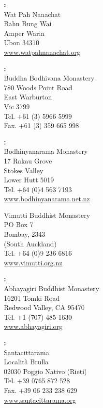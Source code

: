 \columnbreak

{\raggedright

\textbf{\MakeUppercase{\xThailand}:} \\
Wat Pah Nanachat\\
Bahn Bung Wai\\
Amper Warin\\
Ubon 34310\\
\href{http://www.watpahnanachat.org}{www.watpahnanachat.org}

\vfill

\textbf{\MakeUppercase{\xAustralia}:} \\
Buddha Bodhivana Monastery\\
780 Woods Point Road\\
East Warburton\\
Vic 3799\\
Tel. +61 (3) 5966 5999\\
Fax. +61 (3) 359 665 998

\vfill

\textbf{\MakeUppercase{\xNewZealand}:} \\
Bodhinyanarama Monastery\\
17 Rakau Grove\\
Stokes Valley\\
Lower Hutt 5019\\
Tel. +64 (0)4 563 7193\\
\href{http://www.bodhinyanarama.net.nz}{www.bodhinyanarama.net.nz}

Vimutti Buddhist Monastery\\
PO Box 7\\
Bombay, 2343\\
(South Auckland)\\
Tel. +64 (0)9 236 6816\\
\href{http://www.vimutti.org.nz}{www.vimutti.org.nz}

\vfill

\textbf{\MakeUppercase{\xUnitedStates}:} \\
Abhayagiri Buddhist Monastery\\
16201 Tomki Road\\
Redwood Valley, CA 95470\\
Tel. +1 (707) 485 1630\\
\href{http://www.abhayagiri.org}{www.abhayagiri.org}

\vfill

\textbf{\MakeUppercase{\xItaly}:} \\
Santacittarama\\
Località Brulla\\
02030 Poggio Nativo (Rieti)\\
Tel. +39 0765 872 528\\
Fax. +39 06 233 238 629\\
\href{http://www.santacittarama.org}{www.santacittarama.org}


}
